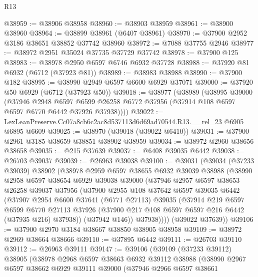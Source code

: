 \begin{lexlean}{R13}
\begin{coremodule}
@38959 := @38906 @38958
@38960 := @38903 @38959
@38961 := @38900 @38960
@38964 := @38899 @38961 (@6407 @38961)
@38970 := @37900 @2952 @3186 @38651 @38852 @37742 @38960
@38972 := @7088 @37755 @2946
@38977 := @38972 @2951 @35024 @37735 @37729 @37742
@38978 := @37900 @125
@38983 := @38978 @2950 @6597 @6746 @6932 @37728
@38988 := @37920 @81 @6932 (@6712 (@37923 @81))
@38989 := @38983 @38988
@38990 := @37900 @182
@38995 := @38990 @2949 @6597 @6600 @6929 @37071
@39000 := @37920 @50 @6929 (@6712 (@37923 @50))
@39018 := @38977
    (@38989
      (@38995
        @39000
        (@37946
          @2948
          @6597
          @6599
          @26258
          @6772
          @37956
          (@37914 @108 @6597 @6597 @6770 @6442 @37926 @37938))))
@39022 := LexLeanPreserve.Cc07a8cb6c2ac8d537113d6d69ad70544.R13.__rel_23 @6905 @6895 @6609
@39025 := @38970 (@39018 (@39022 @6410))
@39031 := @37900 @2961 @3185 @38659 @38851 @38902 @38959
@39034 := @38972 @2960 @38656 @38658
@39035 := @215 @37639
@39037 := @6408 @39035 @6442
@39038 := @26703 @39037
@39039 := @26963 @39038
@39100 := @39031
    (@39034
      (@37233 @39039)
      @38902
      (@38978
        @2959
        @6597
        @38655
        @6932
        @39039
        @38988
        (@38990
          @2958
          @6597
          @38654
          @6929
          @39038
          @39000
          (@37946
            @2957
            @6597
            @38653
            @26258
            @39037
            @37956
            (@37900
              @2955
              @108
              @37642
              @6597
              @39035
              @6442
              (@37907
                @2954
                @6600
                @37641
                (@6771 @27113)
                @39035
                (@37914
                  @219
                  @6597
                  @6599
                  @6770
                  @27113
                  @37926
                  (@37900 @217 @108 @6597 @6597 @216 @6442 (@37935 @216) @37938))
                (@37942 @146))
              @37938))))
      (@39022 @37639))
@39106 := @37900 @2970 @3184 @38667 @38850 @38905 @38958
@39109 := @38972 @2969 @38664 @38666
@39110 := @37895 @6442
@39111 := @26703 @39110
@39112 := @26963 @39111
@39147 := @39106
    (@39109
      (@37233 @39112)
      @38905
      (@38978
        @2968
        @6597
        @38663
        @6932
        @39112
        @38988
        (@38990
          @2967
          @6597
          @38662
          @6929
          @39111
          @39000
          (@37946
            @2966
            @6597
            @38661

\end{coremodule}
\end{lexlean}
